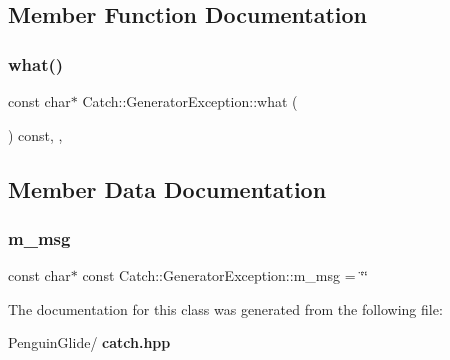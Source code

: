 \subsection{Member Function Documentation}
\mbox{\label{class_catch_1_1_generator_exception_ade029163144d136f12187e5b9a0161d5}} 
\subsubsection{what()}
{\footnotesize\ttfamily const char$\ast$ Catch\+::\+Generator\+Exception\+::what (\begin{DoxyParamCaption}{ }\end{DoxyParamCaption}) const\hspace{0.3cm}{\ttfamily [final]}, {\ttfamily [override]}, {\ttfamily [noexcept]}}



\subsection{Member Data Documentation}
\mbox{\label{class_catch_1_1_generator_exception_a493b6ec9e3be0e3852de73c87dba6e5e}} 
\subsubsection{m\_msg}
{\footnotesize\ttfamily const char$\ast$ const Catch\+::\+Generator\+Exception\+::m\+\_\+msg = \char`\"{}\char`\"{}\hspace{0.3cm}{\ttfamily [private]}}



The documentation for this class was generated from the following file\+:\begin{DoxyCompactItemize}
\item 
Penguin\+Glide/\textbf{ catch.\+hpp}\end{DoxyCompactItemize}

